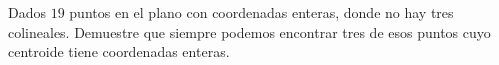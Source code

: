 Dados $19$ puntos en el plano con coordenadas enteras, donde no hay tres colineales. Demuestre que siempre podemos encontrar tres de esos puntos cuyo centroide tiene coordenadas enteras.
